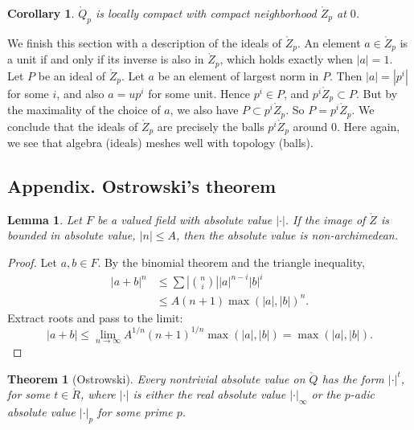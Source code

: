 \documentclass{amsart}
\newtheorem{theorem}[equation]{Theorem}
\newtheorem{lemma}[equation]{Lemma}
\newtheorem{corollary}[equation]{Corollary}
\def\abs#1{{|#1|}}
\begin{document}
\begin{corollary} $\ring{Q}_p$ is locally compact with compact
  neighborhood $\ring{Z}_p$ at $0$.
\end{corollary}

We finish this section with a description of the ideals of
$\ring{Z}_p$.  An element $a\in\ring{Z}_p$ is a unit if and only if
its inverse is also in $\ring{Z}_p$, which holds exactly when
$\abs{a}=1$.  Let $P$ be an ideal of $\ring{Z}_p$.  Let $a$ be an
element of largest norm in $P$.  Then $\abs{a}=\abs{p^i}$ for some
$i$, and also $a = u p^i$ for some unit.  Hence $p^i \in P$, and
$p^i\ring{Z}_p\subset P$.  But by the maximality of the choice of $a$,
we also have $P\subset p^i\ring{Z}_p$.  So $P=p^i\ring{Z}_p$.  We
conclude that the ideals of $\ring{Z}_p$ are precisely the balls
$p^i\ring{Z}_p$ around $0$.  Here again, we see that algebra (ideals)
meshes well with topology (balls).

\newpage
\subsection{Appendix. Ostrowski's theorem}

\begin{lemma} Let $F$ be a valued field with absolute value $\abs{\cdot}$.
If the image of $\ring{Z}$ is bounded in absolute value, $\abs{n}\le A$, 
then the absolute
value is non-archimedean.
\end{lemma}

\begin{proof} Let $a,b\in F$.  By the binomial theorem and the
  triangle inequality,
\begin{align*}
\abs{a+b}^n &\le \sum \abs{{n\choose{i}}}\abs{a}^{n-i}\abs{b}^i\\
    &\le A (n+1)\max(\abs{a},\abs{b})^n.
\end{align*}
Extract roots and pass to the limit:
\[
\abs{a+b} \le \lim_{n\to\infty} A^{1/n}(n+1)^{1/n} \max(\abs{a},\abs{b}) 
= \max(\abs{a},\abs{b}).
\]
\end{proof}

\begin{theorem}[Ostrowski] Every nontrivial absolute value on
  $\ring{Q}$ has the form $\abs{\cdot}^t$, for some $t\in\ring{R}$,
  where $\abs{\cdot}$ is either the real absolute value
  $\abs{\cdot}_\infty$ or the $p$-adic absolute value $\abs{\cdot}_p$
  for some prime $p$.
\end{theorem}
\end{document}

